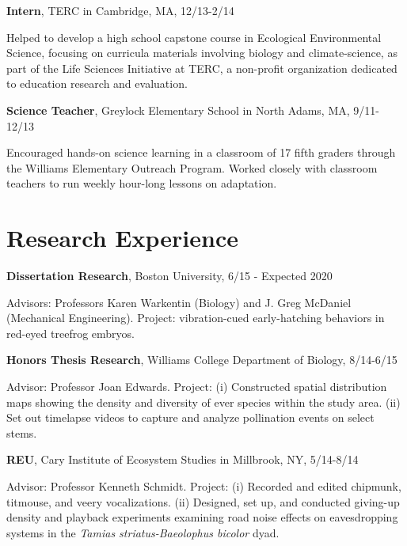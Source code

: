 \documentclass[margin,line]{res}
\begin{document}
\begin{resume}
\vspace{-.1cm}
{\bf Intern},  TERC in Cambridge, MA, 12/13-2/14

\vspace{-.43cm}
{Helped to develop a high school capstone course in Ecological Environmental Science, focusing on curricula materials involving biology and climate-science, as part of the Life Sciences Initiative at TERC, a non-profit organization dedicated to education research and evaluation. }

\vspace{-.1cm}
{\bf Science Teacher},  Greylock Elementary School in North Adams, MA, 9/11-12/13

\vspace{-.43cm}
{Encouraged hands-on science learning in a classroom of 17 fifth graders through the Williams Elementary Outreach Program. Worked closely with classroom teachers to run weekly hour-long lessons on adaptation. }

\section{\sc Research Experience}
{\bf Dissertation Research},  Boston University, 6/15 - Expected 2020 

\vspace{-.43cm}
{Advisors: Professors Karen Warkentin (Biology) and J. Greg McDaniel (Mechanical Engineering). Project: vibration-cued early-hatching behaviors in red-eyed treefrog embryos. }

\vspace{-.1cm}
{\bf Honors Thesis Research},  Williams College Department of Biology, 8/14-6/15 

\vspace{-.43cm}
{Advisor: Professor Joan Edwards. Project: (i) Constructed spatial distribution maps showing the density and diversity of ever species within the study area. (ii) Set out timelapse videos to capture and analyze pollination events on select stems.} 

\vspace{-.1cm}
{\bf REU},  Cary Institute of Ecosystem Studies in Millbrook, NY, 5/14-8/14

\vspace{-.43cm}
{Advisor: Professor Kenneth Schmidt. Project: (i) Recorded and edited chipmunk, titmouse, and veery vocalizations. (ii) Designed, set up, and conducted giving-up density and playback experiments examining road noise effects on eavesdropping systems in the {\it Tamias striatus-Baeolophus bicolor} dyad.}


\end{resume}
\end{document}
